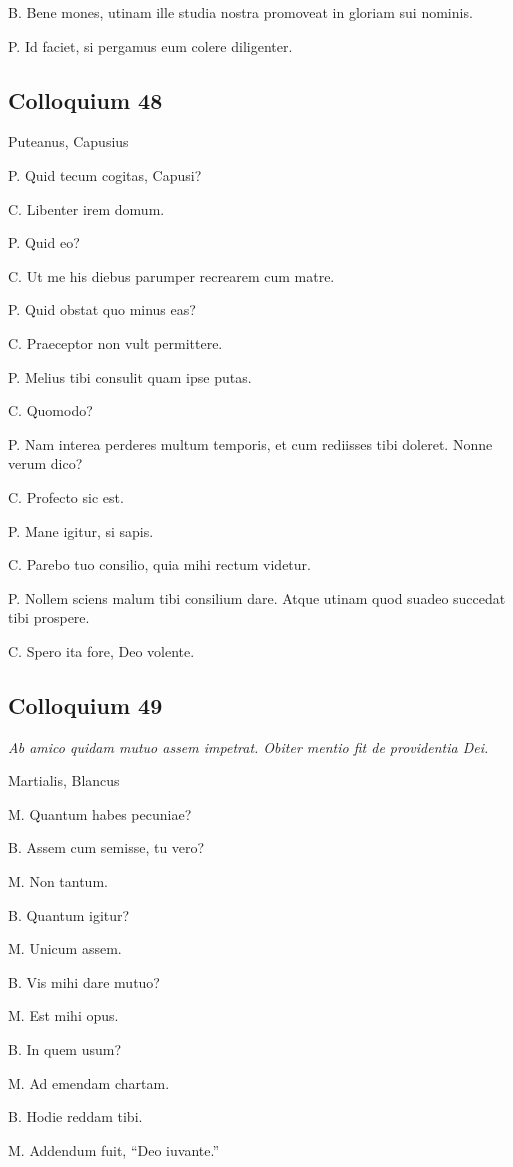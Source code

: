 \documentclass{article}
\begin{document}
B. Bene mones, utinam ille studia nostra promoveat in gloriam sui nominis. 

P. Id faciet, si pergamus eum colere diligenter. 

\subsection{Colloquium 48}
Puteanus, Capusius

P. Quid tecum cogitas, Capusi?

C. Libenter irem domum. 

P. Quid eo?

C. Ut me his diebus parumper recrearem cum matre. 

P. Quid obstat quo minus eas?

C. Praeceptor non vult permittere. 

P. Melius tibi consulit quam ipse putas. 

C. Quomodo?

P. Nam interea perderes multum temporis, et cum rediisses tibi doleret. Nonne verum dico?

C. Profecto sic est. 

P. Mane igitur, si sapis. 

C. Parebo tuo consilio, quia mihi rectum videtur. 

P. Nollem sciens malum tibi consilium dare. Atque utinam quod suadeo succedat tibi prospere. 

C. Spero ita fore, Deo volente.

\subsection{Colloquium 49}
\emph{Ab amico quidam mutuo assem impetrat. Obiter mentio fit de providentia Dei.}

Martialis, Blancus

M. Quantum habes pecuniae?

B. Assem cum semisse, tu vero?

M. Non tantum. 

B. Quantum igitur?

M. Unicum assem. 

B. Vis mihi dare mutuo?

M. Est mihi opus. 

B. In quem usum?

M. Ad emendam chartam. 

B. Hodie reddam tibi. 

M. Addendum fuit, ``Deo iuvante.''
 
\end{document}
